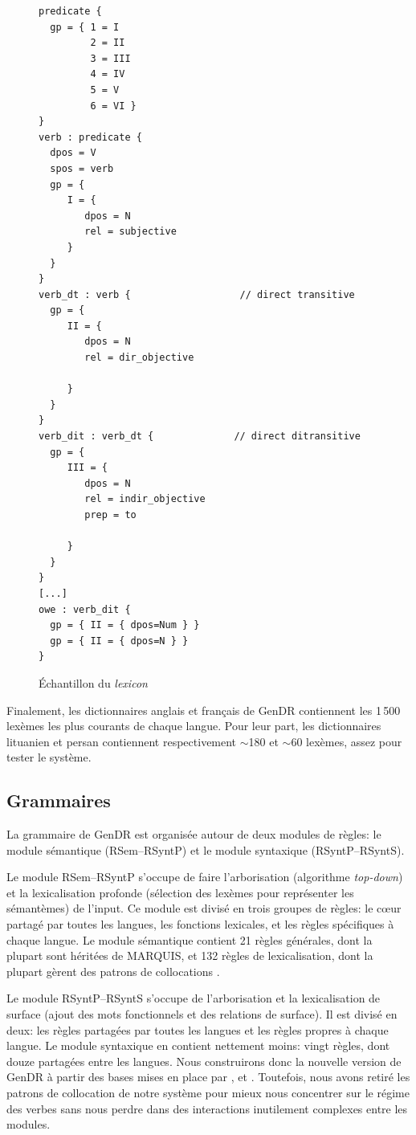 \begin{figure}
\begin{lstlisting}[language=mate]
predicate {
  gp = { 1 = I
         2 = II
         3 = III
         4 = IV
         5 = V
         6 = VI }
}
verb : predicate {
  dpos = V
  spos = verb
  gp = {
     I = {
        dpos = N
        rel = subjective
     }
  }
}
verb_dt : verb {                   // direct transitive
  gp = {
     II = {
        dpos = N
        rel = dir_objective

     }
  }
}
verb_dit : verb_dt {              // direct ditransitive
  gp = {
     III = {
        dpos = N
        rel = indir_objective
        prep = to  

     }
  }
}
[...]
owe : verb_dit {
  gp = { II = { dpos=Num } }
  gp = { II = { dpos=N } }
}
\end{lstlisting}
  \caption{Échantillon du \emph{lexicon}}
	\label{fig:lexicon}
\end{figure}

Finalement, les dictionnaires anglais et français de GenDR contiennent les 1\,500 lexèmes les plus courants de chaque langue. Pour leur part, les dictionnaires lituanien \citep{dubinskaite17} et persan contiennent respectivement $\sim$180 et $\sim$60 lexèmes, assez pour tester le système.


\subsection{Grammaires}
La grammaire de GenDR est organisée autour de deux modules de règles: le module sémantique (\ac{RSem}--\ac{RSyntP}) et le module syntaxique (\ac{RSyntP}--\ac{RSyntS}).

Le module \ac{RSem}--\ac{RSyntP} s'occupe de faire l'arborisation (algorithme \emph{top-down}) et la lexicalisation profonde (sélection des lexèmes pour représenter les sémantèmes) de l'input. Ce module est divisé en trois groupes de règles: le c\oe{}ur partagé par toutes les langues, les fonctions lexicales, et les règles spécifiques à chaque langue. Le module sémantique contient 21 règles générales, dont la plupart sont héritées de MARQUIS, et 132 règles de lexicalisation, dont la plupart gèrent des patrons de collocations \citep{LambreyImplementationcollocationspour2017}.

Le module \ac{RSyntP}--\ac{RSyntS} s'occupe de l'arborisation et la lexicalisation de surface (ajout des mots fonctionnels et des relations de surface). Il est divisé en deux: les règles partagées par toutes les langues et les règles propres à chaque langue. Le module syntaxique en contient nettement moins: vingt règles, dont douze partagées entre les langues. Nous construirons donc la nouvelle version de GenDR à partir des bases mises en place par \cite{LambreyImplementationcollocationspour2017}, \cite{dubinskaite17} et \cite{lareau18}. Toutefois, nous avons retiré les patrons de collocation de notre système pour mieux nous concentrer sur le régime des verbes sans nous perdre dans des interactions inutilement complexes entre les modules.

